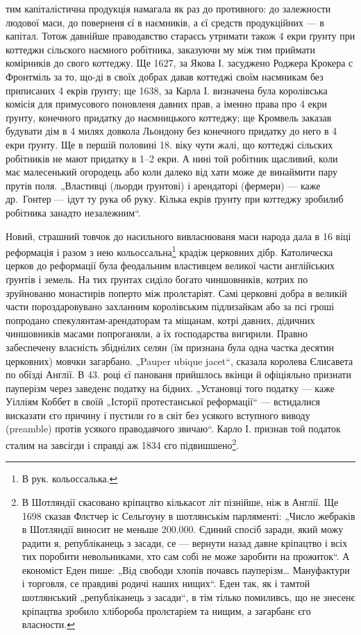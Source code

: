 \parcont{}
тим капіталістична продукція намагала як раз до противного: до залежности людової маси, до поверненя
єї в наємників, а єї средств продукційних — в капітал. Тотож давнійше праводавство стараєсь утримати
також 4 екри ґрунту при коттеджи сільского наємного робітника, заказуючи му між тим приймати
комірників до свого коттеджу. Ще 1627, за Якова І. засуджено Роджера Крокера с Фронтміль за то,
що-ді в своїх добрах давав коттеджі своїм наємникам без приписаних 4 екрів ґрунту; ще 1638, за Карла
І. визначена була королівська комісія для примусового поновленя давних прав, а іменно права про 4
екри ґрунту, конечного придатку до наємницького коттеджу; ще Кромвель заказав будувати дім в 4 милях
довкола Льондону без конечного придатку до него в 4 екри ґрунту. Ще в першій половині 18. віку чути
жалі, що коттеджі сільских робітників не мают придатку в 1--2 екри. А нині той робітник щасливий,
коли має малесенький огородець або коли далеко від хати може де винаймити пару прутів поля.
„Властивці (льорди ґрунтові) і арендаторі (фермери) — каже др.~Гонтер — ідут ту рука об руку. Кілька
екрів ґрунту при коттеджу зробилиб робітника занадто незалежним“.

Новий, страшний товчок до насильного вивласнюваня маси народа дала в 16 віці реформація і разом з
нею кольоссальна\footnote*{
В рук. кольоссалька.
} крадіж церковних дібр. Католическа церков до реформації була феодальним
властивцем великої части англійських ґрунтів і земель. На тих ґрунтах сиділо богато чиншовників,
котрих по зруйнованю монастирів поперто між пролєтаріят. Самі церковні добра в великій части
пороздаровувано захланним королівським підлизайкам або за псі гроші попродано
спекулянтам-арендаторам та міщанам, котрі давних, дідичних чиншовників масами попроганяли, а їх
ґосподарства вигирили. Правно забеспечену власність збіднілих селян (їм признана була одна частка
десятин церковних) мовчки загарбано. „Pauper ubique jacet“, сказала королева Єлисавета по обїзді
Англії. В 43. році єї панованя прийшлось вкінци й офіціяльно признати пауперізм через заведенє
податку на бідних. „Установці того податку
— каже Уілліям Коббет в своїй „Історії протестанської реформації“ — встидалися висказати єго причину
і пустили го в світ без усякого вступного виводу (preamble) протів усякого праводавчого звичаю“.
Карло І. признав той податок сталим на завсігди і справді аж 1834 єго підвишшено\footnote{
В Шотляндії скасовано кріпацтво кількасот літ пізнійше, ніж в Англії. Ще 1698 сказав Флєтчер іс
Сельгоуну в шотлянськім парляменті: „Число жебраків в Шотляндії виносит не меньше 200.000. Єдиний 
спосіб заради, який можу радити я, републіканець з засади, се — вернути
назад давне кріпацтво і всіх тих поробити невольниками, хто сам
собі не може заробити на прожиток“. А економіст Еден пише: „Від свободи
хлопів почавсь пауперізм\dots{} Мануфактури і торговля, се правдиві
родичі наших нищих“. Еден так, як і тамтой шотлянський „републіканець
з засади“, в тім тілько помиливсь, що не знесенє кріпацтва зробило хлібороба
пролєтаріем та нищим, а загарбанє єго власности.
}.
